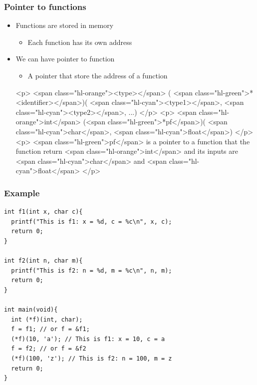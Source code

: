 \documentclass{../c-lecture}
\begin{document}
\begin{frame}
  \frametitle{Pointer to functions}
  \begin{itemize}
    \item Functions are stored in memory
    \begin{itemize}
      \item Each function has its own address
    \end{itemize}
    \item We can have pointer to function
    \begin{itemize}
      \item A pointer that store the address of a function
    \end{itemize}
    <p>
      <span class="hl-orange"><type></span> (
      <span class="hl-green">*<identifier></span>)(
      <span class="hl-cyan"><type1></span>,
      <span class="hl-cyan"><type2></span>, ...)
    </p>
    <p>
      <span class="hl-orange">int</span> (<span class="hl-green">*pf</span>)(
      <span class="hl-cyan">char</span>, <span class="hl-cyan">float</span>)
    </p>
    <p>
      <span class="hl-green">pf</span> is a pointer to a function that the
      function return <span class="hl-orange">int</span> and its inputs are
      <span class="hl-cyan">char</span> and
      <span class="hl-cyan">float</span>
    </p>
  \end{itemize}
\end{frame}

\begin{frame}[fragile]
  \frametitle{Example}
  \begin{verbatim}
int f1(int x, char c){
  printf("This is f1: x = %d, c = %c\n", x, c);
  return 0;
}

int f2(int n, char m){
  printf("This is f2: n = %d, m = %c\n", n, m);
  return 0;
}

int main(void){
  int (*f)(int, char);
  f = f1; // or f = &f1;
  (*f)(10, 'a'); // This is f1: x = 10, c = a
  f = f2; // or f = &f2
  (*f)(100, 'z'); // This is f2: n = 100, m = z
  return 0;
}
  \end{verbatim}
\end{frame}
\end{document}
